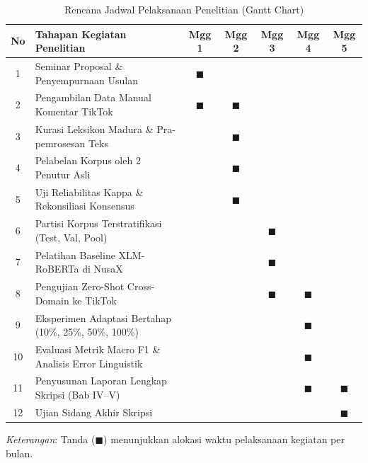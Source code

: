 \begin{table}[H]
\centering
\footnotesize
\setlength{\tabcolsep}{4pt}
\renewcommand{\arraystretch}{1.25}
\begin{tabular}{|c|>{\raggedright\arraybackslash}p{5.2cm}|c|c|c|c|c|}
\hline
\rowcolor{gray!20}
\textbf{No} & \textbf{Tahapan Kegiatan Penelitian} & \textbf{Mgg 1} & \textbf{Mgg 2} & \textbf{Mgg 3} & \textbf{Mgg 4} & \textbf{Mgg 5} \\
\hline
1 & Seminar Proposal \& Penyempurnaan Usulan & $\blacksquare$ & & & & \\
\hline
2 & Pengambilan Data Manual Komentar TikTok & $\blacksquare$ & $\blacksquare$ & & & \\
\hline
3 & Kurasi Leksikon Madura \& Pra-pemrosesan Teks & & $\blacksquare$ & & & \\
\hline
4 & Pelabelan Korpus oleh 2 Penutur Asli & & $\blacksquare$ & & & \\
\hline
5 & Uji Reliabilitas Kappa \& Rekonsiliasi Konsensus & & $\blacksquare$ & & & \\
\hline
6 & Partisi Korpus Terstratifikasi (Test, Val, Pool) & & & $\blacksquare$ & & \\
\hline
7 & Pelatihan Baseline XLM-RoBERTa di NusaX & & & $\blacksquare$ & & \\
\hline
8 & Pengujian Zero-Shot Cross-Domain ke TikTok & & & $\blacksquare$ & $\blacksquare$ & \\
\hline
9 & Eksperimen Adaptasi Bertahap (10\%, 25\%, 50\%, 100\%) & & & & $\blacksquare$ & \\
\hline
10 & Evaluasi Metrik Macro F1 \& Analisis Error Linguistik & & & & $\blacksquare$ & \\
\hline
11 & Penyusunan Laporan Lengkap Skripsi (Bab IV--V) & & & & $\blacksquare$ & $\blacksquare$ \\
\hline
12 & Ujian Sidang Akhir Skripsi & & & & & $\blacksquare$ \\
\hline
\end{tabular}
\vspace{0.1cm}
\begin{flushleft}
\footnotesize
\textit{Keterangan}: Tanda ($\blacksquare$) menunjukkan alokasi waktu pelaksanaan kegiatan per bulan.\\
\end{flushleft}
\caption{Rencana Jadwal Pelaksanaan Penelitian (Gantt Chart)}
\label{tab:jadwal_penelitian}
\end{table}
